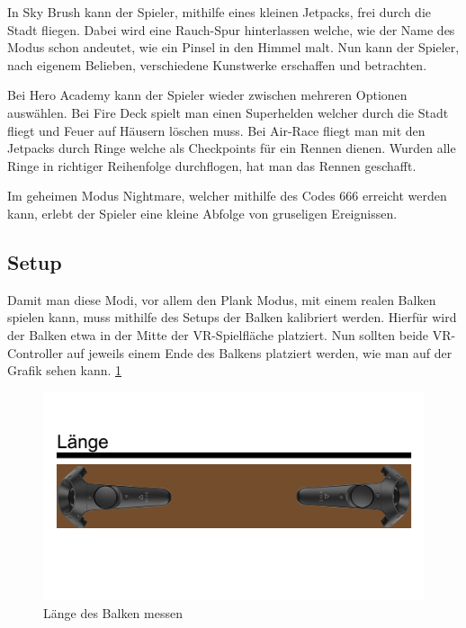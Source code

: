 In Sky Brush kann der Spieler, mithilfe eines kleinen Jetpacks, frei durch die Stadt fliegen.
Dabei wird eine Rauch-Spur hinterlassen welche, wie der Name des Modus schon andeutet, wie ein Pinsel in den Himmel malt.
Nun kann der Spieler, nach eigenem Belieben, verschiedene Kunstwerke erschaffen und betrachten.
~\cite{ToastGames_2021_Steam}

Bei Hero Academy kann der Spieler wieder zwischen mehreren Optionen auswählen.
Bei Fire Deck spielt man einen Superhelden welcher durch die Stadt fliegt und Feuer auf Häusern löschen muss.
Bei Air-Race fliegt man mit den Jetpacks durch Ringe welche als Checkpoints für ein Rennen dienen.
Wurden alle Ringe in richtiger Reihenfolge durchflogen, hat man das Rennen geschafft.
~\cite{ToastGames_2021_Steam}

Im geheimen Modus Nightmare, welcher mithilfe des Codes 666 erreicht werden kann, erlebt der Spieler eine kleine Abfolge von gruseligen Ereignissen.
~\cite{ToastGames_2021_VivePort}

\subsection{Setup}
\label{sec:richiesplankexperience_setup}

Damit man diese Modi, vor allem den Plank Modus, mit einem realen Balken spielen kann, muss mithilfe des Setups der Balken kalibriert werden.
Hierfür wird der Balken etwa in der Mitte der VR-Spielfläche platziert.
Nun sollten beide VR-Controller auf jeweils einem Ende des Balkens platziert werden, wie man auf der Grafik sehen kann.
\ref{fig:beam_length_measurement} %

\begin {figure}
    \includegraphics[scale=0.18]{pics/beam_length_measurement}
    \caption{L\"ange des Balken messen}
    \label{fig:beam_length_measurement}
\end {figure}

